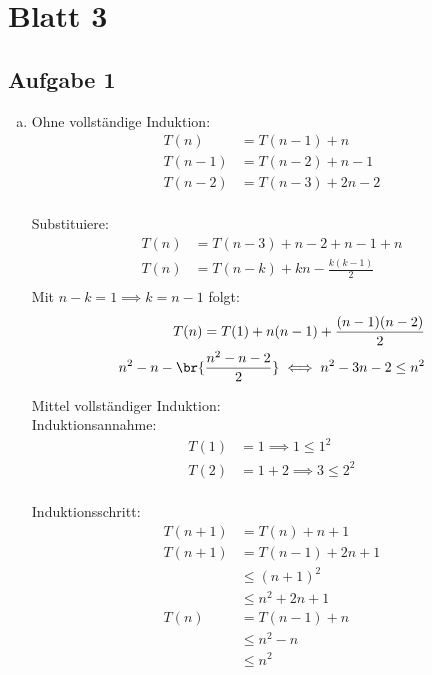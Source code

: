 \section*{Blatt 3}

	\subsection*{Aufgabe 1}
  \begin{enumerate}[a)]
  \item Ohne vollständige Induktion: \\
	\begin{align*}
    T(n) &= T(n-1) + n \\
    T(n-1) &= T(n-2) + n -1 \\
    T(n-2) &= T(n-3) + 2n -2 \\
	\end{align*}

  Substituiere:
  \begin{align*}
    T(n) &= T(n-3) + n-2 + n-1 + n \\
    T(n) &= T(n-k) + kn - \frac{k(k-1)}{2}\\
  \end{align*}
  Mit $n-k=1 \implies k = n-1$ folgt:
  \begin{align*}
    T(n) = T(1) + n(n-1) + \frac{(n-1)(n-2)}{2} \\
    n^2 - n - \br{ \frac{n^2  - n - 2}{2} } \iff n^2 - 3n -2 \leq n^2\\
  \end{align*}

\newpage

  Mittel vollständiger Induktion: \\
  Induktionsannahme: \\
  \begin{align*}
    T(1) &= 1 \implies 1 \leq 1^2 \\
    T(2) &= 1+2 \implies 3 \leq 2^2 \\
  \end{align*}

  Induktionsschritt: \\

  \begin{align*}
    T(n+1) &= T(n) + n + 1 \\
    T(n+1) &= T(n-1) + 2n + 1 \\
           &\leq (n+1)^2 \\
           &\leq n^2 + 2n +1 \\
    T(n) &= T(n-1) + n\\
         &\leq n^2 - n\\
         &\leq n^2 \\
  \end{align*}


\end{enumerate}
